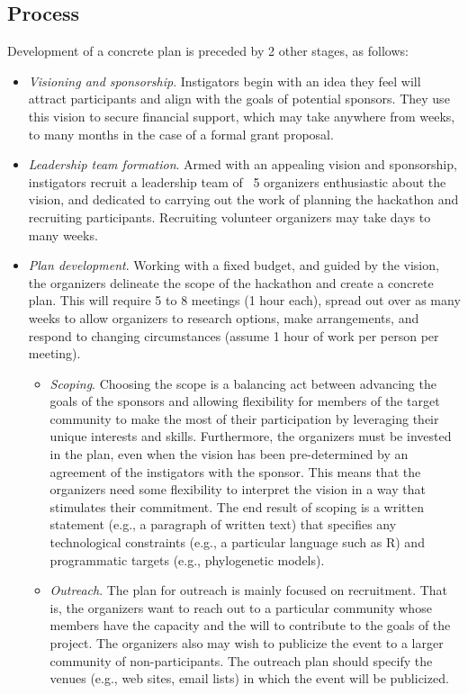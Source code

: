 \documentclass[letterpaper,11pt]{texMemo}
\begin{document}
\subsection{Process}
Development of a concrete plan is preceded by 2 other stages, as follows: 
\begin{itemize}
\item	{\em Visioning and sponsorship}. Instigators begin with an idea they feel will attract participants and align with the goals of potential sponsors. They use this vision to secure financial support, which may take anywhere from weeks, to many months in the case of a formal grant proposal. 
\item	{\em Leadership team formation}. Armed with an appealing vision and sponsorship, instigators recruit a leadership team of ~5 organizers enthusiastic about the vision, and dedicated to carrying out the work of planning the hackathon and recruiting participants. Recruiting volunteer organizers may take days to many weeks. 
\item	{\em Plan development}. Working with a fixed budget, and guided by the vision, the organizers delineate the scope of the hackathon and create a concrete plan. This will require 5 to 8 meetings (1 hour each), spread out over as many weeks to allow organizers to research options, make arrangements, and respond to changing circumstances (assume 1 hour of work per person per meeting). 
\begin{itemize}
\item	{\em Scoping}. Choosing the scope is a balancing act between advancing the goals of the sponsors and allowing flexibility for members of the target community to make the most of their participation by leveraging their unique interests and skills. Furthermore, the organizers must be invested in the plan, even when the vision has been pre-determined by an agreement of the instigators with the sponsor. This means that the organizers need some flexibility to interpret the vision in a way that stimulates their commitment.  The end result of scoping is a written statement (e.g., a paragraph of written text) that specifies any technological constraints (e.g., a particular language such as R) and programmatic targets (e.g., phylogenetic models).  
\item	{\em Outreach}. The plan for outreach is mainly focused on recruitment. That is, the organizers want to reach out to a particular community whose members have the capacity and the will to contribute to the goals of the project. The organizers also may wish to publicize the event to a larger community of non-participants. The outreach plan should specify the venues (e.g., web sites, email lists) in which the event will be publicized. 

\end{itemize}
\end{itemize}
\end{document}
